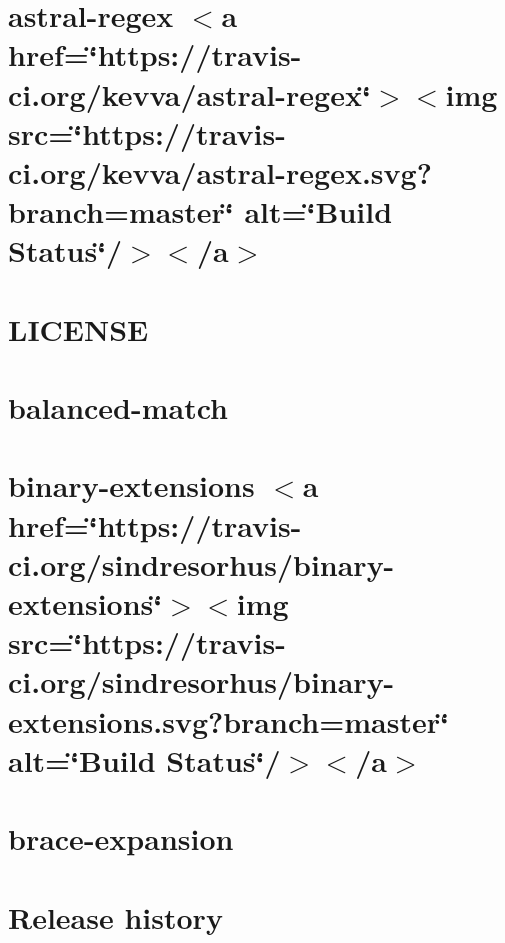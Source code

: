 \let\mypdfximage\pdfximage\def\pdfximage{\immediate\mypdfximage}\documentclass[twoside]{book}
\newcommand{\+}{\discretionary{\mbox{\scriptsize$\hookleftarrow$}}{}{}}
\begin{document}
\chapter{astral-\/regex $<$a href=\char`\"{}https\+://travis-\/ci.\+org/kevva/astral-\/regex\char`\"{}$>$$<$img src=\char`\"{}https\+://travis-\/ci.\+org/kevva/astral-\/regex.\+svg?branch=master\char`\"{} alt=\char`\"{}\+Build Status\char`\"{}/$>$$<$/a$>$}
\label{md_heap-visualizer_node_modules_astral-regex_readme}

\chapter{L\+I\+C\+E\+N\+SE}
\label{md_heap-visualizer_node_modules_balanced-match__l_i_c_e_n_s_e}

\chapter{balanced-\/match}
\label{md_heap-visualizer_node_modules_balanced-match__r_e_a_d_m_e}

\chapter{binary-\/extensions $<$a href=\char`\"{}https\+://travis-\/ci.\+org/sindresorhus/binary-\/extensions\char`\"{}$>$$<$img src=\char`\"{}https\+://travis-\/ci.\+org/sindresorhus/binary-\/extensions.\+svg?branch=master\char`\"{} alt=\char`\"{}\+Build Status\char`\"{}/$>$$<$/a$>$}
\label{md_heap-visualizer_node_modules_binary-extensions_readme}

\chapter{brace-\/expansion}
\label{md_heap-visualizer_node_modules_brace-expansion__r_e_a_d_m_e}

\chapter{Release history}
\label{md_heap-visualizer_node_modules_braces__c_h_a_n_g_e_l_o_g}

\end{document}
